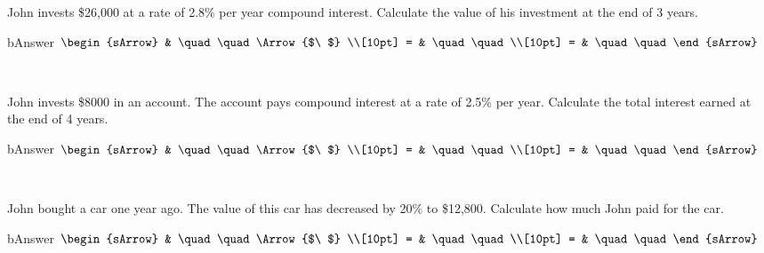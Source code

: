 \begin{mtask}[resume]
  \task John invests \$26,000 at a rate of 2.8\% per year compound interest. Calculate the value of his investment at the end of 3 years.
      \begin{envOut}[height=6cm]{bAnswer}
	       $\begin{sArrow}
	             & \quad\quad       \Arrow{$\ $} \\[10pt]
               = & \quad\quad               \\[10pt]      
			   = & \quad\quad  
	        \end{sArrow}$
      \end{envOut}
	  \begin{shortsolution}  
	     $ \quad \quad \quad \quad$
 	  \end{shortsolution}
	  
  \task  John invests \$8000 in an account. The account pays compound interest at a rate of 2.5\% per year. Calculate the total interest earned at the end of 4 years.
      \begin{envOut}[height=6cm]{bAnswer}
	       $\begin{sArrow}
	             & \quad\quad       \Arrow{$\ $} \\[10pt]
               = & \quad\quad               \\[10pt]      
			   = & \quad\quad  
	        \end{sArrow}$
      \end{envOut}
	  \begin{shortsolution}  
	     $ \quad \quad \quad \quad$
 	  \end{shortsolution}


  \task John bought a car one year ago. The value of this car has decreased by 20\% to \$12,800. Calculate how much John paid for the car.
      \begin{envOut}[height=6cm]{bAnswer}
	       $\begin{sArrow}
	             & \quad\quad       \Arrow{$\ $} \\[10pt]
               = & \quad\quad               \\[10pt]      
			   = & \quad\quad  
	        \end{sArrow}$
      \end{envOut}
	  \begin{shortsolution}  
	     $ \quad \quad \quad \quad$
 	  \end{shortsolution}
	  

\end{mtask}
